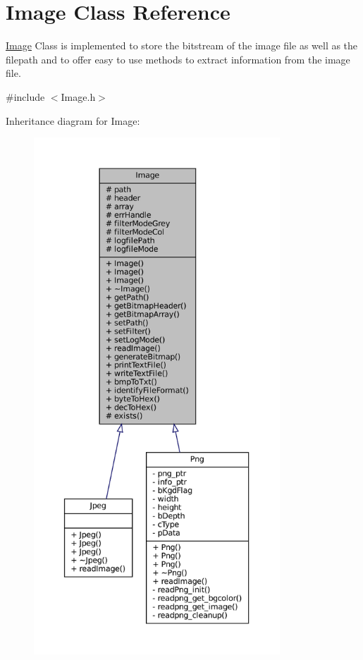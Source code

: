 \hypertarget{classImage}{}\section{Image Class Reference}
\label{classImage}


\mbox{\hyperlink{classImage}{Image}} Class is implemented to store the bitstream of the image file as well as the filepath and to offer easy to use methods to extract information from the image file.  




{\ttfamily \#include $<$Image.\+h$>$}



Inheritance diagram for Image\+:
\nopagebreak
\begin{figure}[H]
\begin{center}
\leavevmode
\includegraphics[height=550pt]{classImage__inherit__graph}
\end{center}
\end{figure}


